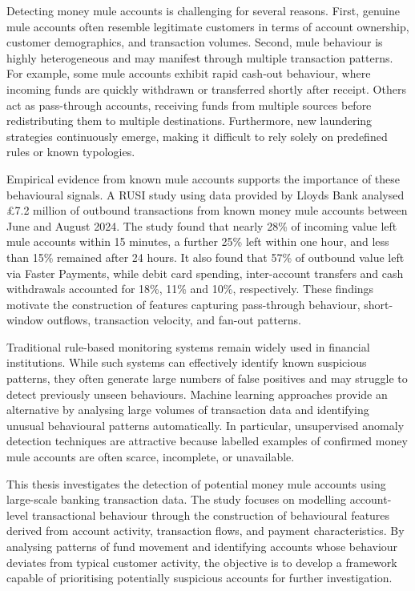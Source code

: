 Detecting money mule accounts is challenging for several reasons. First, genuine mule accounts often resemble legitimate customers in terms of account ownership, customer demographics, and transaction volumes. Second, mule behaviour is highly heterogeneous and may manifest through multiple transaction patterns. For example, some mule accounts exhibit rapid cash-out behaviour, where incoming funds are quickly withdrawn or transferred shortly after receipt. Others act as pass-through accounts, receiving funds from multiple sources before redistributing them to multiple destinations. Furthermore, new laundering strategies continuously emerge, making it difficult to rely solely on predefined rules or known typologies.

Empirical evidence from known mule accounts supports the importance of these behavioural
signals. A RUSI study \cite{westmore2025followingfraud} using data provided by Lloyds Bank analysed \pounds7.2 million of
outbound transactions from known money mule accounts between June and August 2024. The
study found that nearly 28\% of incoming value left mule accounts within 15 minutes, a further
25\% left within one hour, and less than 15\% remained after 24 hours. It also found that 57\%
of outbound value left via Faster Payments, while debit card spending, inter-account transfers
and cash withdrawals accounted for 18\%, 11\% and 10\%, respectively. These findings motivate
the construction of features capturing pass-through behaviour, short-window outflows,
transaction velocity, and fan-out patterns.

Traditional rule-based monitoring systems remain widely used in financial institutions. While such systems can effectively identify known suspicious patterns, they often generate large numbers of false positives and may struggle to detect previously unseen behaviours. Machine learning approaches provide an alternative by analysing large volumes of transaction data and identifying unusual behavioural patterns automatically. In particular, unsupervised anomaly detection techniques are attractive because labelled examples of confirmed money mule accounts are often scarce, incomplete, or unavailable.

This thesis investigates the detection of potential money mule accounts using large-scale banking transaction data. The study focuses on modelling account-level transactional behaviour through the construction of behavioural features derived from account activity, transaction flows, and payment characteristics. By analysing patterns of fund movement and identifying accounts whose behaviour deviates from typical customer activity, the objective is to develop a framework capable of prioritising potentially suspicious accounts for further investigation.
